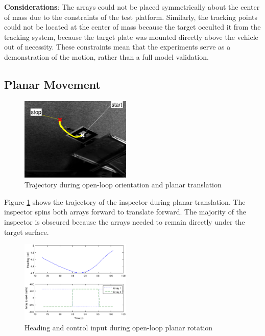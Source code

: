 \documentclass[letterpaper, 10 pt, conference]{ieeeconf}  %
\begin{document}
\par \textbf{Considerations}: The arrays could not be placed symmetrically about the center of mass due to the constraints of the test platform. Similarly, the tracking points could not be located at the center of mass because the target occulted it from the tracking system, because the target plate was mounted directly above the vehicle out of necessity. These constraints mean that the experiments serve as a demonstration of the motion, rather than a full model validation.  

\subsection{Planar Movement}\label{sec:planar_movement_exp}
   
   \begin{figure}[thpb]
      \centering
      \includegraphics[width = 0.47\textwidth]{figures/planar_translation.eps}
      \caption{Trajectory during open-loop orientation and planar translation}
      \label{fig:planar_translation_exp_trajectory}
   \end{figure}
   
   \par Figure \ref{fig:planar_translation_exp_trajectory} shows the trajectory of the inspector during planar translation. The inspector spins both arrays forward to translate forward. The majority of the inspector is obscured because the arrays needed to remain directly under the target surface.
   

      \begin{figure}[thpb]
      \centering
      \includegraphics[width = 0.47\textwidth]{figures/planar_rotation.eps}
      \caption{Heading and control input during open-loop planar rotation}
      \label{fig:planar_rotation_exp}
   \end{figure}
   
\end{document}
